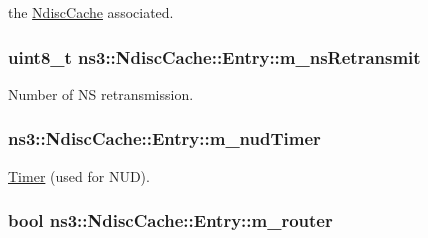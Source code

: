 the \hyperlink{classns3_1_1NdiscCache}{Ndisc\+Cache} associated. 

\subsubsection[{\texorpdfstring{m\+\_\+ns\+Retransmit}{m_nsRetransmit}}]{\setlength{\rightskip}{0pt plus 5cm}uint8\+\_\+t ns3\+::\+Ndisc\+Cache\+::\+Entry\+::m\+\_\+ns\+Retransmit\hspace{0.3cm}{\ttfamily [private]}}\hypertarget{classns3_1_1NdiscCache_1_1Entry_a54e66d2227da0181d02474d51fad198f}{}\label{classns3_1_1NdiscCache_1_1Entry_a54e66d2227da0181d02474d51fad198f}


Number of NS retransmission. 

\subsubsection[{\texorpdfstring{m\+\_\+nud\+Timer}{m_nudTimer}}]{ ns3\+::\+Ndisc\+Cache\+::\+Entry\+::m\+\_\+nud\+Timer\hspace{0.3cm}{\ttfamily [private]}}\hypertarget{classns3_1_1NdiscCache_1_1Entry_ad81790b631a991bdecc6d9ff4d86ad9d}{}\label{classns3_1_1NdiscCache_1_1Entry_ad81790b631a991bdecc6d9ff4d86ad9d}


\hyperlink{classns3_1_1Timer}{Timer} (used for N\+UD). 

\subsubsection[{\texorpdfstring{m\+\_\+router}{m_router}}]{\setlength{\rightskip}{0pt plus 5cm}bool ns3\+::\+Ndisc\+Cache\+::\+Entry\+::m\+\_\+router\hspace{0.3cm}{\ttfamily [private]}}\hypertarget{classns3_1_1NdiscCache_1_1Entry_a04bd22fcb77caf25e535ae0f92cbac8f}{}\label{classns3_1_1NdiscCache_1_1Entry_a04bd22fcb77caf25e535ae0f92cbac8f}


